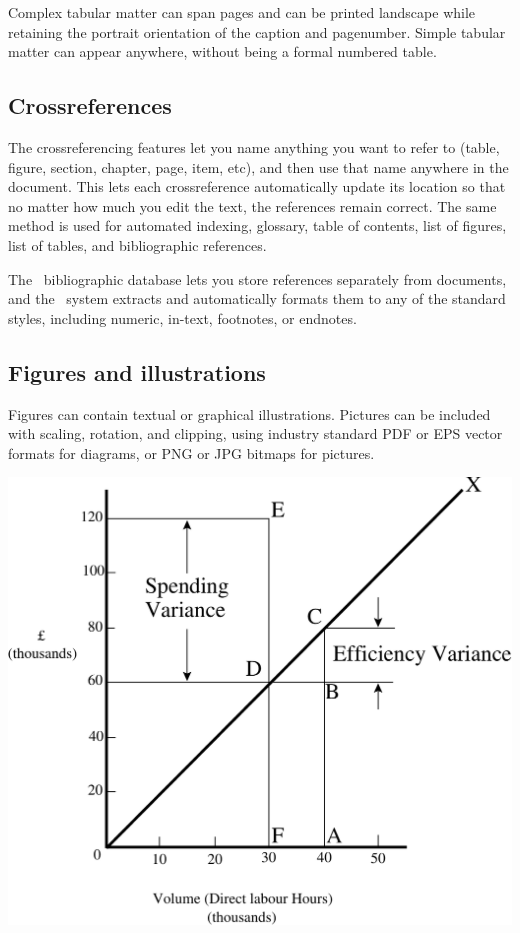 \documentclass[fleqn]{article}
\begin{document}
\begin{multicols}{3}
Complex tabular matter can span pages and can be printed landscape
while retaining the portrait orientation of the caption and
pagenumber.  Simple tabular matter can appear anywhere, without being
a formal numbered table.

\subsection{Crossreferences}

The crossreferencing features let you name anything you want to refer
to (table, figure, section, chapter, page, item, etc), and then use
that name anywhere in the document.
This lets each crossreference automatically update its location so
that no matter how much you edit the text, the references remain
correct. The same method is used for automated indexing, glossary,
table of contents, list of figures, list of tables, and bibliographic
references.

The \BibTeX\ bibliographic database lets you store references
separately from documents, and the \BibLaTeX\ system extracts and
automatically formats them to any of the standard styles, including
numeric, in-text, footnotes, or endnotes.

\subsection{Figures and illustrations}

Figures can contain textual or graphical illustrations. Pictures can
be included with scaling, rotation, and clipping, using industry
standard PDF or EPS vector formats for diagrams, or PNG or JPG bitmaps
for pictures.
\par\medskip\noindent
\includegraphics[width=\columnwidth]{diagram-crop}
\par\vspace{-6pt}\begingroup{}\endgroup\medskip


\end{multicols}
\end{document}
